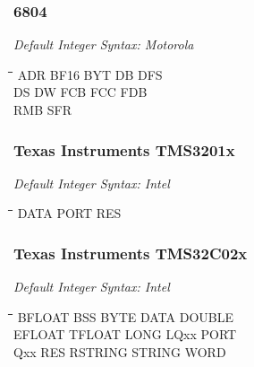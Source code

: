 \subsubsection{6804}

{\em Default Integer Syntax: Motorola}

{\tt\begin{tabbing}
\hspace{3cm}\=\hspace{3cm}\=\hspace{3cm}\=\hspace{3cm}\=\kill
ADR        \> BF16        \> BYT         \> DB          \> DFS \\
DS         \> DW          \> FCB         \> FCC         \> FDB \\
RMB        \> SFR \\
\end{tabbing}}

\subsubsection{Texas Instruments TMS3201x}

{\em Default Integer Syntax: Intel}

{\tt\begin{tabbing}
\hspace{3cm}\=\hspace{3cm}\=\hspace{3cm}\=\hspace{3cm}\=\kill
DATA       \> PORT        \> RES \\
\end{tabbing}}

\subsubsection{Texas Instruments TMS32C02x}

{\em Default Integer Syntax: Intel}

{\tt\begin{tabbing}
\hspace{3cm}\=\hspace{3cm}\=\hspace{3cm}\=\hspace{3cm}\=\kill
BFLOAT     \> BSS         \> BYTE        \> DATA        \> DOUBLE \\ 
EFLOAT     \> TFLOAT      \> LONG        \> LQxx        \> PORT \\
Qxx        \> RES         \> RSTRING     \> STRING      \> WORD \\
\end{tabbing}}


